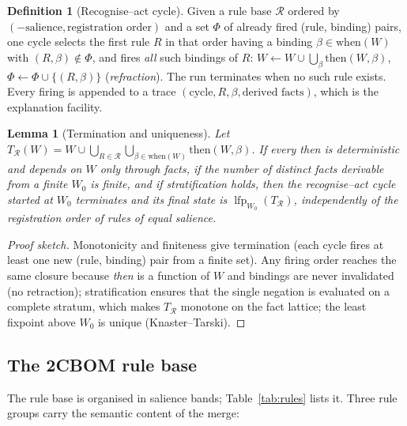 \documentclass[11pt,a4paper]{article}
\newcommand{\twocbom}{2CBOM}
\newcommand{\lfp}{\operatorname{lfp}}
\theoremstyle{definition}
\newtheorem{definition}{Definition}[section]
\theoremstyle{plain}
\newtheorem{lemma}[theorem]{Lemma}
\begin{document}
\begin{definition}[Recognise--act cycle]\label{def:cycle}
Given a rule base $\mathcal{R}$ ordered by $(-\text{salience}, \text{registration order})$ and a
set $\Phi$ of already fired (rule, binding) pairs, one cycle selects the first rule $R$ in that
order having a binding $\beta \in \text{when}(W)$ with $(R,\beta) \notin \Phi$, and fires
\emph{all} such bindings of $R$: $W \leftarrow W \cup \bigcup_\beta \text{then}(W,\beta)$,
$\Phi \leftarrow \Phi \cup \{(R,\beta)\}$ (\emph{refraction}). The run terminates when no such
rule exists. Every firing is appended to a trace $(\text{cycle}, R, \beta, \text{derived facts})$,
which is the explanation facility.
\end{definition}

\begin{lemma}[Termination and uniqueness]\label{lem:fixpoint}
Let $T_{\mathcal R}(W) = W \cup \bigcup_{R \in \mathcal R} \bigcup_{\beta \in \text{when}(W)} \text{then}(W,\beta)$.
If every \emph{then} is deterministic and depends on $W$ only through facts, if the number of
distinct facts derivable from a finite $W_0$ is finite, and if stratification holds, then the
recognise--act cycle started at $W_0$ terminates and its final state is $\lfp_{W_0}(T_{\mathcal R})$,
independently of the registration order of rules of equal salience.
\end{lemma}
\begin{proof}[Proof sketch]
Monotonicity and finiteness give termination (each cycle fires at least one new (rule, binding)
pair from a finite set). Any firing order reaches the same closure because \emph{then} is a
function of $W$ and bindings are never invalidated (no retraction); stratification ensures that
the single negation is evaluated on a complete stratum, which makes $T_{\mathcal R}$ monotone on
the fact lattice; the least fixpoint above $W_0$ is unique (Knaster--Tarski).
\end{proof}

\subsection{The \twocbom{} rule base}
The rule base is organised in salience bands; Table~\ref{tab:rules} lists it. Three rule groups
carry the semantic content of the merge:
\end{document}
